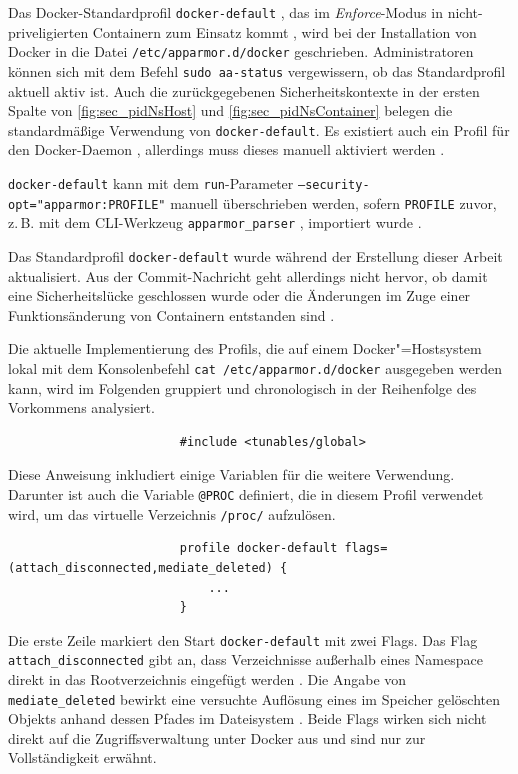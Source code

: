 \documentclass[../main.tex]{subfiles}
\begin{document}
				Das Docker-Standardprofil \texttt{docker-default} \cite{githubAppArmorProfileContainer}, das im \emph{Enforce}-Modus in nicht-priveligierten Containern zum Einsatz kommt \cite{docker110Security}, wird bei der Installation von Docker in die Datei \texttt{/etc/apparmor.d/docker} geschrieben. Administratoren können sich mit dem Befehl \texttt{sudo aa-status} vergewissern, ob das Standardprofil aktuell aktiv ist. Auch die zurückgegebenen Sicherheitskontexte in der ersten Spalte von \fig \ref{fig:sec_pidNsHost} und \fig \ref{fig:sec_pidNsContainer} belegen die standardmäßige Verwendung von \texttt{docker-default}. Es existiert auch ein Profil für den Docker-Daemon \cite{githubAppArmorProfileDaemon}, allerdings muss dieses manuell aktiviert werden \cite{githubAppArmorDoc}.

				\texttt{docker-default} kann mit dem \texttt{run}-Parameter \texttt{--security-opt="{}apparmor:PROFILE"{}} manuell überschrieben werden, sofern \texttt{PROFILE} zuvor, z.\,B. mit dem \acrshort{CLI}-Werkzeug \texttt{apparmor\_parser} \cite{apparmorParser}, importiert wurde \cite{dockerRun}.


					Das Standardprofil \texttt{docker-default} wurde während der Erstellung dieser Arbeit aktualisiert. Aus der Commit-Nachricht geht allerdings nicht hervor, ob damit eine Sicherheitslücke geschlossen wurde oder die Änderungen im Zuge einer Funktionsänderung von Containern entstanden sind \cite{githubAppArmorProfileContainerFix}.

					Die aktuelle Implementierung des Profils, die auf einem Docker"=Hostsystem lokal mit dem Konsolenbefehl \texttt{cat /etc/apparmor.d/docker} ausgegeben werden kann, wird im Folgenden gruppiert und chronologisch in der Reihenfolge des Vorkommens analysiert.

					\begin{lstlisting}
						#include <tunables/global>
					\end{lstlisting}
					Diese Anweisung inkludiert einige Variablen für die weitere Verwendung. Darunter ist auch die Variable \texttt{@{PROC}} definiert, die in diesem Profil verwendet wird, um das virtuelle Verzeichnis \texttt{/proc/} aufzulösen.

					\begin{lstlisting}
						profile docker-default flags=(attach_disconnected,mediate_deleted) {
							...
						}
					\end{lstlisting}
					Die erste Zeile markiert den Start \texttt{docker-default} mit zwei Flags. Das Flag \texttt{attach\_disconnected} gibt an, dass Verzeichnisse außerhalb eines Namespace direkt in das Rootverzeichnis eingefügt werden \cite{apparmorPolicyReference}. Die Angabe von \texttt{mediate\_deleted} bewirkt eine versuchte Auflösung eines im Speicher gelöschten Objekts anhand dessen Pfades im Dateisystem \cite{apparmorFAQ}. Beide Flags wirken sich nicht direkt auf die Zugriffsverwaltung unter Docker aus und sind nur zur Vollständigkeit erwähnt.
\end{document}

